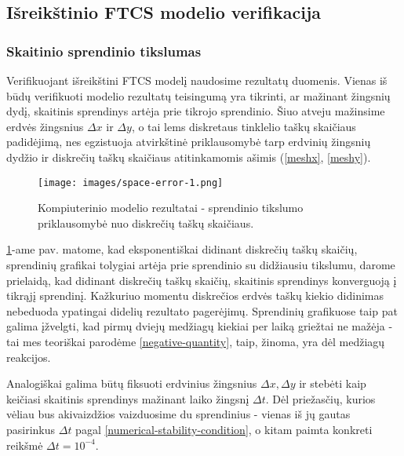 \subsection{Išreikštinio FTCS modelio verifikacija}

\subsubsection*{Skaitinio sprendinio tikslumas}

Verifikuojant išreikštini FTCS modelį naudosime rezultatų duomenis. Vienas iš būdų verifikuoti modelio rezultatų teisingumą yra tikrinti, ar mažinant žingsnių dydį, skaitinis sprendinys artėja prie tikrojo sprendinio. Šiuo atveju mažinsime erdvės žingsnius $\Delta x$ ir $\Delta y$, o tai lems diskretaus tinklelio taškų skaičiaus padidėjimą, nes egzistuoja atvirkštinė priklausomybė tarp erdvinių žingsnių dydžio ir diskrečių taškų skaičiaus atitinkamomis ašimis (\ref{meshx}, \ref{meshy}).

\newpage

\begin{figure}[h!]
    \centering
    \texttt{[image: images/space-error-1.png]}

    \caption{Kompiuterinio modelio rezultatai - sprendinio tikslumo priklausomybė nuo diskrečių taškų skaičiaus. }

    \label{results-space-error}
\end{figure}

\ref{results-space-error}-ame pav. matome, kad eksponentiškai didinant diskrečių taškų skaičių, sprendinių grafikai tolygiai artėja prie sprendinio su didžiausiu tikslumu, darome prielaidą, kad didinant diskrečių taškų skaičių, skaitinis sprendinys konverguoją į tikrąjį sprendinį. Kažkuriuo momentu diskrečios erdvės taškų kiekio didinimas nebeduoda ypatingai didelių rezultato pagerėjimų. Sprendinių grafikuose taip pat galima įžvelgti, kad pirmų dviejų medžiagų kiekiai per laiką griežtai ne mažėja - tai mes teoriškai parodėme \eqref{negative-quantity}, taip, žinoma, yra dėl  medžiagų reakcijos. 

Analogiškai galima būtų fiksuoti erdvinius žingsnius $\Delta x, \Delta y$ ir stebėti kaip keičiasi skaitinis sprendinys mažinant laiko žingsnį $\Delta t$. Dėl priežasčių, kurios vėliau bus akivaizdžios vaizduosime du sprendinius - vienas iš jų gautas pasirinkus $\Delta t$ pagal \eqref{numerical-stability-condition}, o kitam paimta konkreti reikšmė $\Delta t = 10^{-4}$.


